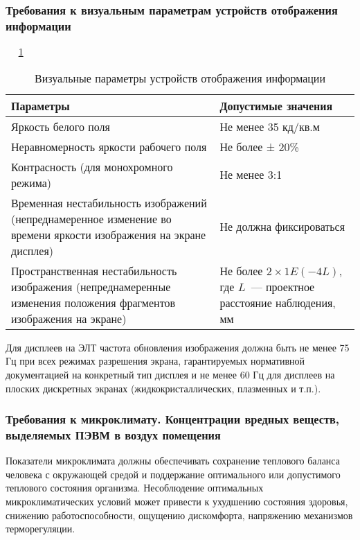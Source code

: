 \subsubsection{Требования к визуальным параметрам устройств отображения информации}


~\cite{sanpin_2.4.1340-03}
~\ref{tab:life_4}


\begin{table}[h!]
\caption{ Визуальные параметры устройств отображения информации }
\label{tab:life_4}
\begin{center}
\begin{tabularx}{\linewidth}{|>{\hsize=0.7\hsize}X|>{\hsize=0.3\hsize}X|}
\hline
Параметры & Допустимые значения\\
\hline
Яркость белого поля & Не менее 35 кд/кв.м\\
\hline
Неравномерность яркости рабочего поля & Не более ± 20\%\\
\hline
Контрасность (для монохромного режима) & Не менее 3:1\\
\hline
Временная нестабильность изображений (непреднамеренное изменение во времени яркости 
изображения на экране дисплея) & Не должна фиксироваться\\
\hline
Пространственная нестабильность изображения (непреднамеренные изменения 
положения фрагментов изображения на экране)& Не более $2\times1E(-4L)$, где $L$~--- проектное расстояние наблюдения, мм\\
\hline
\end{tabularx}
\end{center}
\end{table}

Для дисплеев на ЭЛТ частота обновления изображения должна быть не менее 75 Гц при всех режимах 
разрешения экрана, гарантируемых нормативной документацией на конкретный тип дисплея и не менее 60 Гц 
для дисплеев на плоских дискретных экранах (жидкокристаллических, плазменных и т.п.).~\cite{sanpin_2.4.1340-03}


\subsubsection{Требования к микроклимату. Концентрации вредных веществ, выделяемых ПЭВМ в воздух помещения}


 Показатели микроклимата должны обеспечивать сохранение теплового баланса человека с окружающей средой и 
 поддержание оптимального или допустимого теплового состояния организма.
 Несоблюдение оптимальных микроклиматических условий может привести к ухудшению состояния здоровья,
 снижению работоспособности, ощущению дискомфорта, напряжению механизмов терморегуляции.
 
